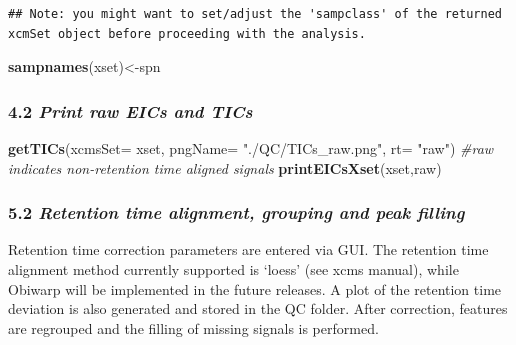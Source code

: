 \documentclass[
]{article}
\newenvironment{Shaded}{\begin{snugshade}}{\end{snugshade}}
\newcommand{\CommentTok}[1]{\textcolor[rgb]{0.56,0.35,0.01}{\textit{#1}}}
\newcommand{\DataTypeTok}[1]{\textcolor[rgb]{0.13,0.29,0.53}{#1}}
\newcommand{\KeywordTok}[1]{\textcolor[rgb]{0.13,0.29,0.53}{\textbf{#1}}}
\newcommand{\NormalTok}[1]{#1}
\newcommand{\StringTok}[1]{\textcolor[rgb]{0.31,0.60,0.02}{#1}}
\begin{document}
\begin{verbatim}
## Note: you might want to set/adjust the 'sampclass' of the returned xcmSet object before proceeding with the analysis.
\end{verbatim}

\begin{Shaded}
\begin{Highlighting}[]
\KeywordTok{sampnames}\NormalTok{(xset)<{-}spn}
\end{Highlighting}
\end{Shaded}

\hypertarget{print-raw-eics-and-tics-1}{%
\subsubsection{\texorpdfstring{4.2 \emph{Print raw EICs and
TICs}}{4.2 Print raw EICs and TICs}}\label{print-raw-eics-and-tics-1}}

\begin{Shaded}
\begin{Highlighting}[]
\KeywordTok{getTICs}\NormalTok{(}\DataTypeTok{xcmsSet=}\NormalTok{ xset, }\DataTypeTok{pngName=} \StringTok{"./QC/TICs\_raw.png"}\NormalTok{, }\DataTypeTok{rt=} \StringTok{"raw"}\NormalTok{)}
\CommentTok{\#raw indicates non{-}retention time aligned signals}
\KeywordTok{printEICsXset}\NormalTok{(xset,}\StringTok{\textquotesingle{}raw\textquotesingle{}}\NormalTok{)}
\end{Highlighting}
\end{Shaded}

\hypertarget{retention-time-alignment-grouping-and-peak-filling-1}{%
\subsubsection{\texorpdfstring{5.2 \emph{Retention time alignment,
grouping and peak
filling}}{5.2 Retention time alignment, grouping and peak filling}}\label{retention-time-alignment-grouping-and-peak-filling-1}}

Retention time correction parameters are entered via GUI. The retention
time alignment method currently supported is `loess' (see xcms manual),
while Obiwarp will be implemented in the future releases. A plot of the
retention time deviation is also generated and stored in the QC folder.
After correction, features are regrouped and the filling of missing
signals is performed.
\end{document}
